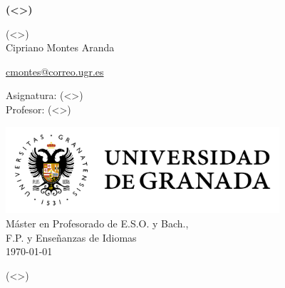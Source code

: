 \documentclass[12pt]{article}
\begin{document}
\begin{titlepage}
        \begin{center}
                \vspace*{0.5cm}

                \Huge
		\textbf{(<>)}

                \vspace{0.5cm}
                \Large
		(<>)\\
                \vspace{2.5cm}
                Cipriano Montes Aranda


                \large
                \href{mailto:cmontes@correo.ugr.es}{cmontes@correo.ugr.es}

                \large
                \vfill
		Asignatura: (<>)\\
		Profesor: (<>)

                \vspace{0.5cm}
                \includegraphics[width=4in]{ugr.png}\\
		Máster en Profesorado de E.S.O. y Bach.,\\ F.P. y Enseñanzas de Idiomas\\
                \today\\
        \end{center}
\end{titlepage}

\pagestyle{empty}

\onehalfspace

\tableofcontents


\newpage

\normalsize

\pagestyle{fancy}

(<>)

\newpage

\printbibliography
\end{document}
